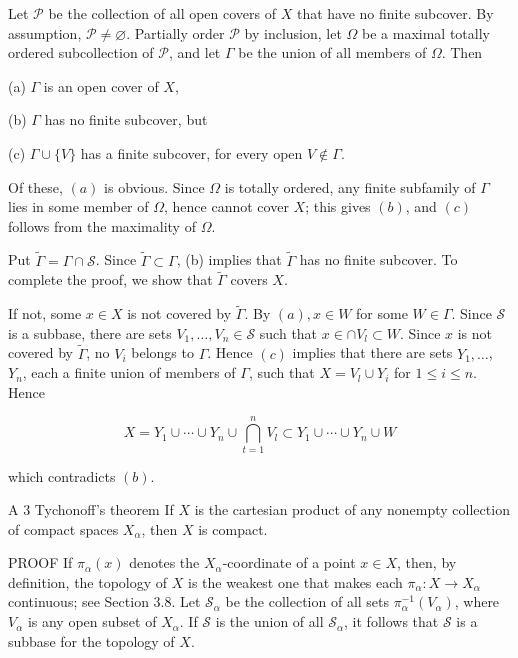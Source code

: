 \documentclass[10pt]{article}
\begin{document}
Let $\mathscr{P}$ be the collection of all open covers of $X$ that have no finite subcover. By assumption, $\mathscr{P} \neq \varnothing$. Partially order $\mathscr{P}$ by inclusion, let $\Omega$ be a maximal totally ordered subcollection of $\mathscr{P}$, and let $\Gamma$ be the union of all members of $\Omega$. Then

(a) $\Gamma$ is an open cover of $X$,

(b) $\Gamma$ has no finite subcover, but

(c) $\Gamma \cup\{V\}$ has a finite subcover, for every open $V \notin \Gamma$.

Of these, $(a)$ is obvious. Since $\Omega$ is totally ordered, any finite subfamily of $\Gamma$ lies in some member of $\Omega$, hence cannot cover $X$; this gives $(b)$, and $(c)$ follows from the maximality of $\Omega$.

Put $\tilde{\Gamma}=\Gamma \cap \mathscr{S}$. Since $\tilde{\Gamma} \subset \Gamma$, (b) implies that $\tilde{\Gamma}$ has no finite subcover. To complete the proof, we show that $\tilde{\Gamma}$ covers $X$.

If not, some $x \in X$ is not covered by $\tilde{\Gamma}$. By $(a), x \in W$ for some $W \in \Gamma$. Since $\mathscr{S}$ is a subbase, there are sets $V_{1}, \ldots, V_{n} \in \mathscr{S}$ such that $x \in \cap V_{l} \subset W$. Since $x$ is not covered by $\tilde{\Gamma}$, no $V_{i}$ belongs to $\Gamma$. Hence $(c)$ implies that there are sets $Y_{1}, \ldots$, $Y_{n}$, each a finite union of members of $\Gamma$, such that $X=V_{l} \cup Y_{i}$ for $1 \leq i \leq n$. Hence

$$
X=Y_{1} \cup \cdots \cup Y_{n} \cup \bigcap_{t=1}^{n} V_{l} \subset Y_{1} \cup \cdots \cup Y_{n} \cup W
$$

which contradicts $(b)$.

A 3 Tychonoff's theorem If $X$ is the cartesian product of any nonempty collection of compact spaces $X_{\alpha}$, then $X$ is compact.

PROOF If $\pi_{\alpha}(x)$ denotes the $X_{\alpha}$-coordinate of a point $x \in X$, then, by definition, the topology of $X$ is the weakest one that makes each $\pi_{\alpha}: X \rightarrow X_{\alpha}$ continuous; see Section 3.8. Let $\mathscr{S}_{\alpha}$ be the collection of all sets $\pi_{\alpha}^{-1}\left(V_{\alpha}\right)$, where $V_{\alpha}$ is any open subset of $X_{\alpha}$. If $\mathscr{S}$ is the union of all $\mathscr{S}_{\alpha}$, it follows that $\mathscr{S}$ is a subbase for the topology of $X$.
\end{document}
